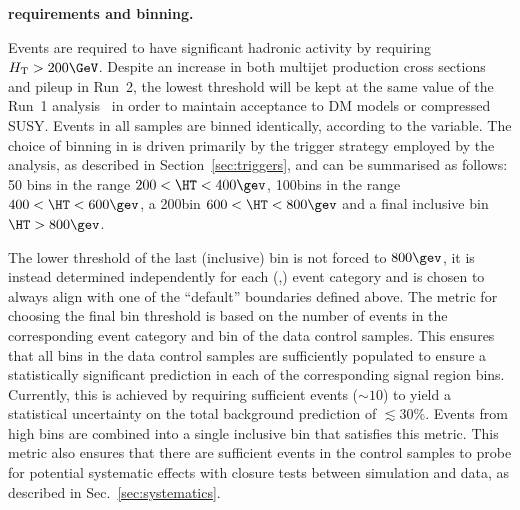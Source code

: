 {\bf \HT requirements and binning.} 

Events are required to have significant hadronic activity by requiring
$\scalht > 200\GeV$. Despite an increase in both multijet production
cross sections and pileup in Run~2, the lowest \HT threshold will be
kept at the same value of the Run~1 analysis~\cite{Chatrchyan:2013lya}
in order to maintain acceptance to DM models or compressed
SUSY. Events in all samples are binned identically, according to the
\HT variable. The choice of binning in \HT is driven primarily by the
trigger strategy employed by the analysis, as described in
Section~\ref{sec:triggers}, and can be summarised as follows: 50\gev
bins in the range $200 < \HT < 400\gev$, 100\gev bins in the range
$400 < \HT < 600\gev$, a 200\gev bin $600<\HT<800\gev$ and a final 
inclusive bin $\HT > 800\gev$.

The lower threshold of the last (inclusive) \HT bin is not forced to
$800\gev$, it is instead determined
independently for each (\njet,\nb) event category and is chosen to
always align with one of the ``default'' boundaries defined above. The
metric for choosing the final bin threshold is based on the number of
events in the corresponding event category and \HT bin of the data
control samples. This ensures that all bins in the data control
samples are sufficiently populated to ensure a statistically
significant prediction in each of the corresponding signal region
bins. Currently, this is achieved by requiring sufficient events
($\sim 10$) to yield a statistical uncertainty on the total background
prediction of $\lesssim30\%$. Events from high \HT bins are combined
into a single inclusive bin that satisfies this metric. This metric
also ensures that there are sufficient events in the control samples
to probe for potential systematic effects with closure tests between
simulation and data, as described in Sec.~\ref{sec:systematics}.

